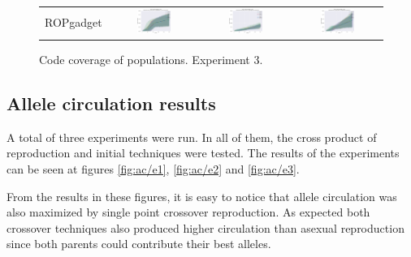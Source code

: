 \documentclass{article}
\begin{document}
\begin{landscape}
\begin{figure}[t]
\begin{center}
\begin{tabular}{c c c c}
    ROPgadget & \includegraphics[align=c,width=0.42\textwidth]{cc/e3/4} & \includegraphics[align=c,width=0.42\textwidth]{cc/e3/5} & \includegraphics[align=c,width=0.42\textwidth]{cc/e3/6} \\
\end{tabular}
\end{center}
\caption{Code coverage of populations. Experiment 3.}
\label{fig:cc/e3}
\end{figure}
\end{landscape}
\restoregeometry
\pagestyle{plain}

\subsection{Allele circulation results}
A total of three experiments were run. In all of them, the cross product of reproduction and initial techniques were tested. The results of the experiments can be seen at figures \ref{fig:ac/e1}, \ref{fig:ac/e2} and \ref{fig:ac/e3}.

From the results in these figures, it is easy to notice that allele circulation was also maximized by single point crossover reproduction. As expected both crossover techniques also produced higher circulation than asexual reproduction since both parents could contribute their best alleles.
\end{document}
